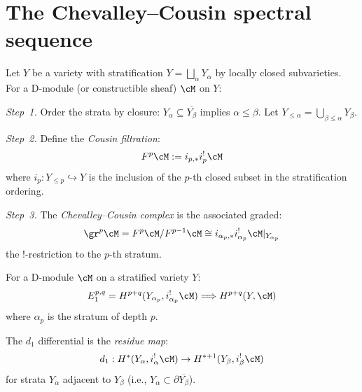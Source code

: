 \section{The Chevalley--Cousin spectral sequence}
\label{sec:chevalley-cousin}


\begin{construction}
\label{constr:chevalley-cousin}
Let $Y$ be a variety with stratification $Y = \bigsqcup_\alpha Y_\alpha$ by 
locally closed subvarieties. For a D-module (or constructible sheaf) $\cM$ on $Y$:

\emph{Step~1.} Order the strata by closure: $Y_\alpha \subseteq \overline{Y_\beta}$ 
implies $\alpha \leq \beta$. Let $Y_{\leq \alpha} = \bigcup_{\beta \leq \alpha} Y_\beta$.

\emph{Step~2.} Define the \emph{Cousin filtration}:
\[
F^p \cM := i_{p,*} i_p^! \cM
\]
where $i_p: Y_{\leq p} \hookrightarrow Y$ is the inclusion of the $p$-th closed 
subset in the stratification ordering.

\emph{Step~3.} The \emph{Chevalley--Cousin complex} is the associated graded:
\[
\gr^p \cM = F^p \cM / F^{p-1} \cM \cong i_{\alpha_p,*} i_{\alpha_p}^! \cM|_{Y_{\alpha_p}}
\]
the $!$-restriction to the $p$-th stratum.
\end{construction}

\begin{theorem}
\label{thm:chevalley-cousin-ss}
For a D-module $\cM$ on a stratified variety $Y$:
\[
E_1^{p,q} = H^{p+q}(Y_{\alpha_p}, i_{\alpha_p}^! \cM) \Longrightarrow H^{p+q}(Y, \cM)
\]
where $\alpha_p$ is the stratum of depth $p$.

The $d_1$ differential is the \emph{residue map}:
\[
d_1: H^*(Y_\alpha, i_\alpha^! \cM) \to H^{*+1}(Y_{\beta}, i_\beta^! \cM)
\]
for strata $Y_\alpha$ adjacent to $Y_\beta$ (i.e., $Y_\alpha \subset \partial \overline{Y_\beta}$).
\end{theorem}

